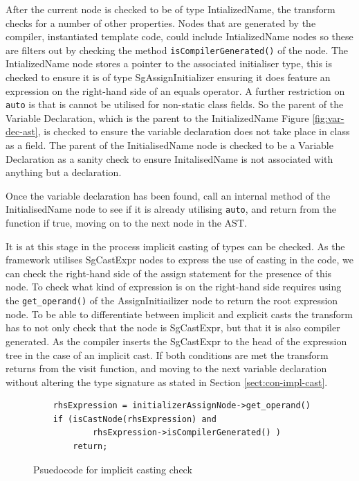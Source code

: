 \documentclass[bsc,frontabs,singlespacing,twoside,parskip,deptreport]{infthesis}
\begin{document}
After the current node is checked to be of type IntializedName, the transform checks for a number of other properties. Nodes that are generated by the compiler, instantiated template code, could include IntializedName nodes so these are filters out by checking the method \texttt{isCompilerGenerated()} of the node. The IntializedName node stores a pointer to the associated initialiser type, this is checked to ensure it is of type SgAssignInitializer ensuring it does feature an expression on the right-hand side of an equals operator. A further restriction on \texttt{auto} is that is cannot be utilised for non-static class fields. So the parent of the Variable Declaration, which is the parent to the InitializedName Figure \ref{fig:var-dec-ast}, is checked to ensure the variable declaration does not take place in class as a field. The parent of the InitialisedName node is checked to be a Variable Declaration as a sanity check to ensure InitalisedName is not associated with anything but a declaration. 

Once the variable declaration has been found, call an internal method of the InitialisedName node to see if it is already utilising \texttt{auto}, and return from the function if true, moving on to the next node in the AST. 

It is at this stage in the process implicit casting of types can be checked. As the framework utilises SgCastExpr nodes to express the use of casting in the code, we can check the right-hand side of the assign statement for the presence of this node. To check what kind of expression is on the right-hand side requires using the \texttt{get\_operand()} of the AssignInitiailizer node to return the root expression node. To be able to differentiate between implicit and explicit casts the transform has to not only check that the node is SgCastExpr, but that it is also compiler generated. As the compiler inserts the SgCastExpr to the head of the expression tree in the case of an implicit cast. If both conditions are met the transform returns from the visit function, and moving to the next variable declaration without altering the type signature as stated in Section \ref{sect:con-impl-cast}. 

\begin{figure}[!h]
    \centering
    \begin{verbatim}
    rhsExpression = initializerAssignNode->get_operand()
    if (isCastNode(rhsExpression) and 
            rhsExpression->isCompilerGenerated() )
        return;
    \end{verbatim}
    \caption{Psuedocode for implicit casting check}
    \label{fig:cast-check-code}
\end{figure}
\end{document}
